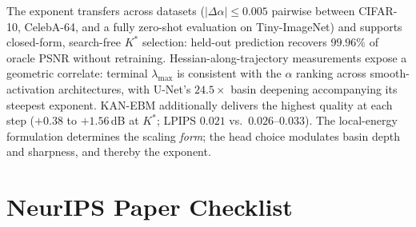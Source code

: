 \documentclass{article}
\begin{document}
The exponent transfers across datasets ($|\Delta\alpha|{\leq}0.005$ pairwise between CIFAR-10, CelebA-64, and a fully zero-shot evaluation on Tiny-ImageNet) and supports closed-form, search-free $K^*$ selection: held-out prediction recovers $99.96\%$ of oracle PSNR without retraining. Hessian-along-trajectory measurements expose a geometric correlate: terminal $\lambda_{\max}$ is consistent with the $\alpha$ ranking across smooth-activation architectures, with U-Net's $24.5{\times}$ basin deepening accompanying its steepest exponent. KAN-EBM additionally delivers the highest quality at each step ($+0.38$ to $+1.56$\,dB at $K^*$; LPIPS $0.021$ vs.~$0.026$--$0.033$). The local-energy formulation determines the scaling \emph{form}; the head choice modulates basin depth and sharpness, and thereby the exponent.




\newpage

\section*{NeurIPS Paper Checklist}
\end{document}
